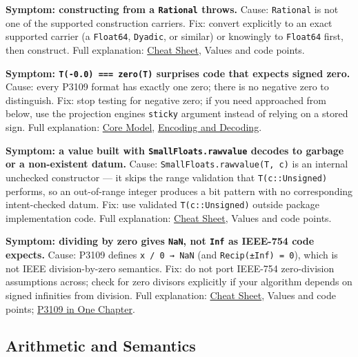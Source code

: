 \textbf{Symptom: constructing from a \texttt{Rational} throws.} Cause: \texttt{Rational} is not one of the supported construction carriers. Fix: convert explicitly to an exact supported carrier (a \texttt{Float64}, \texttt{Dyadic}, or similar) or knowingly to \texttt{Float64} first, then construct. Full explanation: \href{help\_\allowbreak{}cheat\_\allowbreak{}sheet.md}{Cheat Sheet}, Values and code points.



\textbf{Symptom: \texttt{T(-0.0) === zero(T)} surprises code that expects signed zero.} Cause: every P3109 format has exactly one zero; there is no negative zero to distinguish. Fix: stop testing for negative zero; if you need {\textquotedbl}approached from below,{\textquotedbl} use the projection engine{\textquotesingle}s \texttt{sticky} argument instead of relying on a stored sign. Full explanation: \href{core\_\allowbreak{}model.md}{Core Model}, \href{internals\_\allowbreak{}encoding\_\allowbreak{}decoding.md}{Encoding and Decoding}.



\textbf{Symptom: a value built with \texttt{SmallFloats.rawvalue} decodes to garbage or a non-existent datum.} Cause: \texttt{SmallFloats.rawvalue(\allowbreak{}T, c)} is an internal unchecked constructor — it skips the range validation that \texttt{T(c::Unsigned)} performs, so an out-of-range integer produces a bit pattern with no corresponding intent-checked datum. Fix: use validated \texttt{T(c::Unsigned)} outside package implementation code. Full explanation: \href{help\_\allowbreak{}cheat\_\allowbreak{}sheet.md}{Cheat Sheet}, Values and code points.



\textbf{Symptom: dividing by zero gives \texttt{NaN}, not \texttt{Inf} as IEEE-754 code expects.} Cause: P3109 defines \texttt{x / 0 → NaN} (and \texttt{Recip(±Inf) = 0}), which is not IEEE division-by-zero semantics. Fix: do not port IEEE-754 zero-division assumptions across; check for zero divisors explicitly if your algorithm depends on signed infinities from division. Full explanation: \href{help\_\allowbreak{}cheat\_\allowbreak{}sheet.md}{Cheat Sheet}, Values and code points; \href{concept\_\allowbreak{}p3109.md}{P3109 in One Chapter}.



\subsection{Arithmetic and Semantics}



